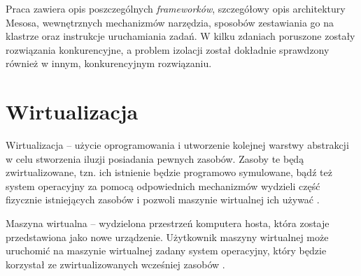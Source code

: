 \documentclass[10pt,a4paper,titlepage,twoside]{report}
\begin{document}
Praca zawiera opis poszczególnych \textit{frameworków}, szczegółowy opis architektury Mesosa, wewnętrznych mechanizmów narzędzia, sposobów zestawiania go na klastrze oraz instrukcje uruchamiania zadań. W kilku zdaniach poruszone zostały rozwiązania konkurencyjne, a problem izolacji został dokładnie sprawdzony również w innym, konkurencyjnym rozwiązaniu.

\section{Wirtualizacja}
\indent \indent Wirtualizacja – użycie oprogramowania i utworzenie kolejnej warstwy abstrakcji w celu stworzenia iluzji posiadania pewnych zasobów. Zasoby te będą zwirtualizowane, tzn. ich istnienie będzie programowo symulowane, bądź też system operacyjny za pomocą odpowiednich mechanizmów wydzieli część fizycznie istniejących zasobów i pozwoli maszynie wirtualnej ich używać \cite{ad15}.

Maszyna wirtualna – wydzielona przestrzeń komputera hosta, która zostaje przedstawiona jako nowe urządzenie. Użytkownik maszyny wirtualnej może uruchomić na maszynie wirtualnej zadany system operacyjny, który będzie korzystał ze zwirtualizowanych wcześniej zasobów \cite{ad15}.
\end{document}
